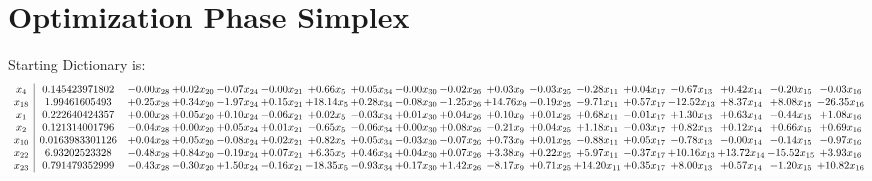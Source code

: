 \documentclass[9pt]{article}
\begin{document}
\section{Optimization Phase Simplex}
Starting Dictionary is:
\[\begin{array}{c| c c@{\hskip 2pt} c@{\hskip 2pt} c@{\hskip 2pt} c@{\hskip 2pt} c@{\hskip 2pt} c@{\hskip 2pt} c@{\hskip 2pt} c@{\hskip 2pt} c@{\hskip 2pt} c@{\hskip 2pt} c@{\hskip 2pt} c@{\hskip 2pt} c@{\hskip 2pt} c@{\hskip 2pt} c@{\hskip 2pt} c@{\hskip 2pt} }
 x_{4}   &  0.145423971802 & -0.00 x_{28} & +  0.02 x_{20} & -0.07 x_{24} & -0.00 x_{21} & +  0.66 x_{5} & +  0.05 x_{34} & -0.00 x_{30} & -0.02 x_{26} & +  0.03 x_{9} & -0.03 x_{25} & -0.28 x_{11} & +  0.04 x_{17} & -0.67 x_{13} & +  0.42 x_{14} & -0.20 x_{15} & -0.03 x_{16}\\
 x_{18}   &  1.99461605493 & +  0.25 x_{28} & +  0.34 x_{20} & -1.97 x_{24} & +  0.15 x_{21} & + 18.14 x_{5} & +  0.28 x_{34} & -0.08 x_{30} & -1.25 x_{26} & + 14.76 x_{9} & -0.19 x_{25} & -9.71 x_{11} & +  0.57 x_{17} & -12.52 x_{13} & +  8.37 x_{14} & +  8.08 x_{15} & -26.35 x_{16}\\
 x_{1}   &  0.222640424357 & +  0.00 x_{28} & +  0.05 x_{20} & +  0.10 x_{24} & -0.06 x_{21} & +  0.02 x_{5} & -0.03 x_{34} & +  0.01 x_{30} & +  0.04 x_{26} & +  0.10 x_{9} & +  0.01 x_{25} & +  0.68 x_{11} & -0.01 x_{17} & +  1.30 x_{13} & +  0.63 x_{14} & -0.44 x_{15} & +  1.08 x_{16}\\
 x_{2}   &  0.121314001796 & -0.04 x_{28} & +  0.00 x_{20} & +  0.05 x_{24} & +  0.01 x_{21} & -0.65 x_{5} & -0.06 x_{34} & +  0.00 x_{30} & +  0.08 x_{26} & -0.21 x_{9} & +  0.04 x_{25} & +  1.18 x_{11} & -0.03 x_{17} & +  0.82 x_{13} & +  0.12 x_{14} & +  0.66 x_{15} & +  0.69 x_{16}\\
 x_{10}   &  0.0163983301126 & +  0.04 x_{28} & +  0.05 x_{20} & -0.08 x_{24} & +  0.02 x_{21} & +  0.82 x_{5} & +  0.05 x_{34} & -0.03 x_{30} & -0.07 x_{26} & +  0.73 x_{9} & +  0.01 x_{25} & -0.88 x_{11} & +  0.05 x_{17} & -0.78 x_{13} & -0.00 x_{14} & -0.14 x_{15} & -0.97 x_{16}\\
 x_{22}   &  6.93202523328 & -0.48 x_{28} & +  0.84 x_{20} & -0.19 x_{24} & +  0.07 x_{21} & +  6.35 x_{5} & +  0.46 x_{34} & +  0.04 x_{30} & +  0.07 x_{26} & +  3.38 x_{9} & +  0.22 x_{25} & +  5.97 x_{11} & -0.37 x_{17} & + 10.16 x_{13} & + 13.72 x_{14} & -15.52 x_{15} & +  3.93 x_{16}\\
 x_{23}   &  0.791479352999 & -0.43 x_{28} & -0.30 x_{20} & +  1.50 x_{24} & -0.16 x_{21} & -18.35 x_{5} & -0.93 x_{34} & +  0.17 x_{30} & +  1.42 x_{26} & -8.17 x_{9} & +  0.71 x_{25} & + 14.20 x_{11} & +  0.35 x_{17} & +  8.00 x_{13} & +  0.57 x_{14} & -1.20 x_{15} & + 10.82 x_{16}\\

\end{array}\]
\end{document}
